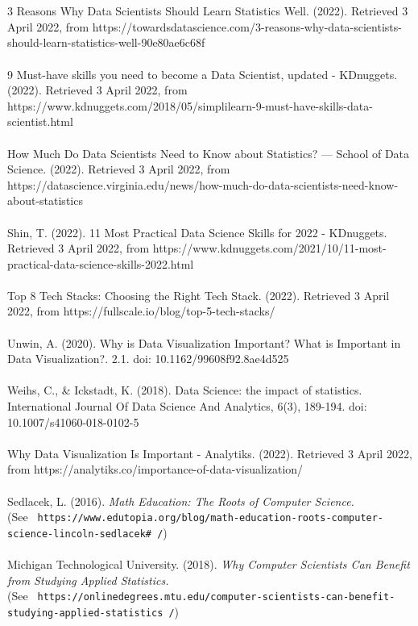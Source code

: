 \documentclass[a4paper, 11pt]{report}
\begin{document}
	\\
	\\
	3 Reasons Why Data Scientists Should Learn Statistics Well. (2022). Retrieved 3 April 2022, from https://towardsdatascience.com/3-reasons-why-data-scientists-should-learn-statistics-well-90e80ae6c68f
	\\
	\\
	9 Must-have skills you need to become a Data Scientist, updated - KDnuggets. (2022). Retrieved 3 April 2022, from https://www.kdnuggets.com/2018/05/simplilearn-9-must-have-skills-data-scientist.html
	\\
	\\
	How Much Do Data Scientists Need to Know about Statistics? — School of Data Science. (2022). Retrieved 3 April 2022, from https://datascience.virginia.edu/news/how-much-do-data-scientists-need-know-about-statistics
	\\
	\\
	Shin, T. (2022). 11 Most Practical Data Science Skills for 2022 - KDnuggets. Retrieved 3 April 2022, from https://www.kdnuggets.com/2021/10/11-most-practical-data-science-skills-2022.html
	\\
	\\
	Top 8 Tech Stacks: Choosing the Right Tech Stack. (2022). Retrieved 3 April 2022, from https://fullscale.io/blog/top-5-tech-stacks/
	\\
	\\
	Unwin, A. (2020). Why is Data Visualization Important? What is Important in Data Visualization?. 2.1. doi: 10.1162/99608f92.8ae4d525
	\\
	\\
	Weihs, C., \& Ickstadt, K. (2018). Data Science: the impact of statistics. International Journal Of Data Science And Analytics, 6(3), 189-194. doi: 10.1007/s41060-018-0102-5
	\\
	\\
	Why Data Visualization Is Important - Analytiks. (2022). Retrieved 3 April 2022, from https://analytiks.co/importance-of-data-visualization/
	\\
	\\
	Sedlacek, L. (2016). \textit{ Math Education: The Roots of Computer Science.} \\(See \texttt{ https://www.edutopia.org/blog/math-education-roots-computer-science-lincoln-sedlacek# /})
	\\
	\\
	Michigan Technological University. (2018). \textit{ Why Computer Scientists Can Benefit from Studying Applied Statistics.}\\ (See \texttt{ https://onlinedegrees.mtu.edu/computer-scientists-can-benefit-studying-applied-statistics /})
\end{document}
